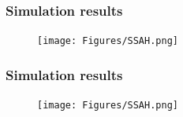 \begin{frame}
	\frametitle{Simulation results} \footnotesize
	\begin{center}
		\begin{figure}
			\texttt{[image: Figures/SSAH.png]}\\
		\end{figure}
		\scriptsize{ \color{blue}{}}
	\end{center}
\end{frame}
\begin{frame}
	\frametitle{Simulation results} \footnotesize
	\begin{center}
		\begin{figure}
			\texttt{[image: Figures/SSAH.png]}\\
		\end{figure}
		\scriptsize{ \color{blue}{}}
	\end{center}
\end{frame}







